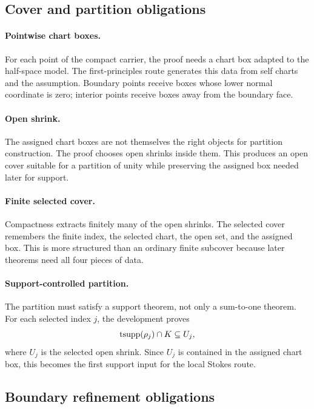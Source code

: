 \subsection{Cover and partition obligations}

\paragraph{Pointwise chart boxes.}
For each point of the compact carrier, the proof needs a chart box adapted to
the half-space model.  The first-principles route generates this data from
self charts and the  assumption.  Boundary points receive
boxes whose lower normal coordinate is zero; interior points receive boxes
away from the boundary face.

\paragraph{Open shrink.}
The assigned chart boxes are not themselves the right objects for partition
construction.  The proof chooses open shrinks inside them.  This produces an
open cover suitable for a partition of unity while preserving the assigned box
needed later for support.

\paragraph{Finite selected cover.}
Compactness extracts finitely many of the open shrinks.  The selected cover
remembers the finite index, the selected chart, the open set, and the assigned
box.  This is more structured than an ordinary finite subcover because later
theorems need all four pieces of data.

\paragraph{Support-controlled partition.}
The partition must satisfy a support theorem, not only a sum-to-one theorem.
For each selected index \(j\), the development proves
\[
  \operatorname{tsupp}(\rho_j)\cap K \subseteq U_j,
\]
where \(U_j\) is the selected open shrink.  Since \(U_j\) is contained in the
assigned chart box, this becomes the first support input for the local Stokes
route.

\subsection{Boundary refinement obligations}

